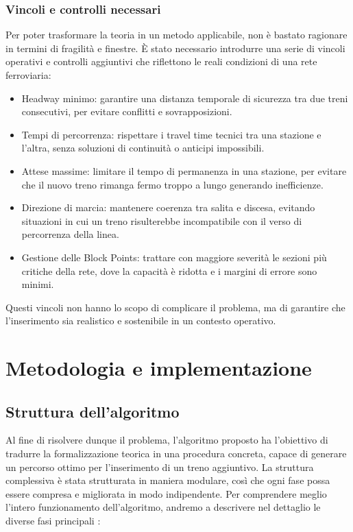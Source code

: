 \documentclass[a4paper,12pt]{report}
\begin{document}
\subsection{Vincoli e controlli necessari}
Per poter trasformare la teoria in un metodo applicabile, non è bastato ragionare in termini di fragilità e finestre. È stato necessario introdurre una serie di vincoli operativi e controlli aggiuntivi che riflettono le reali condizioni di una rete ferroviaria:
\begin{itemize}

\item Headway minimo: garantire una distanza temporale di sicurezza tra due treni consecutivi, per evitare conflitti e sovrapposizioni.

\item Tempi di percorrenza: rispettare i travel time tecnici tra una stazione e l’altra, senza soluzioni di continuità o anticipi impossibili.

\item Attese massime: limitare il tempo di permanenza in una stazione, per evitare che il nuovo treno rimanga fermo troppo a lungo generando inefficienze.

\item Direzione di marcia: mantenere coerenza tra salita e discesa, evitando situazioni in cui un treno risulterebbe incompatibile con il verso di percorrenza della linea.

\item Gestione delle Block Points: trattare con maggiore severità le sezioni più critiche della rete, dove la capacità è ridotta e i margini di errore sono minimi.

\end{itemize}
Questi vincoli non hanno lo scopo di complicare il problema, ma di garantire che l’inserimento sia realistico e sostenibile in un contesto operativo.





\chapter{Metodologia e implementazione}
\section{Struttura dell’algoritmo}

Al fine di risolvere dunque il problema, l'algoritmo proposto ha l'obiettivo di tradurre la formalizzazione teorica in una procedura concreta, capace di generare un percorso ottimo per l’inserimento di un treno aggiuntivo. La struttura complessiva è stata strutturata in maniera modulare, così che ogni fase possa essere compresa e migliorata in modo indipendente.
Per comprendere meglio l’intero funzionamento dell'algoritmo, andremo a descrivere nel dettaglio le diverse fasi principali : 
\end{document}

